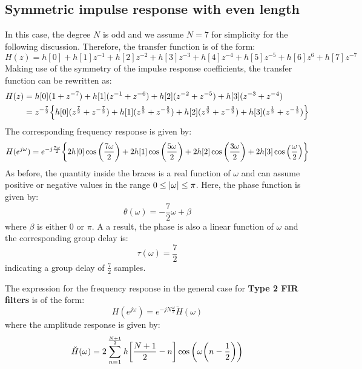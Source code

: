 \documentclass[../../main/main.tex]{subfiles}
\begin{document}
\subsection{Symmetric impulse response with even length}
In this case, the degree \( N \) is odd and we assume \( N = 7 \) for simplicity for the following discussion. Therefore, the transfer function is of the form:
\begin{equation}
    H(z)
    =
    h[0] + h[1]z^{-1} + h[2]z^{-2} + h[3]z^{-3} + h[4]z^{-4} + h[5]z^{-5} + h[6]z^{6} + h[7]z^{-7}
    \label{eq:L20_S23_1}
\end{equation}
Making use of the symmetry of the impulse response coefficients, the transfer function can be rewritten as:
\begin{align}
    H(z)
    &=
        h[0](1 + z^{-7}) + h[1](z^{-1} + z^{-6}) + h[2](z^{-2} + z^{-5}) + h[3](z^{-3} + z^{-4})   \nonumber   \\
    &=
        z^{-\frac{7}{2}} \qty{h[0](z^{\frac{7}{2}} + z^{-\frac{7}{2}}) + h[1](z^{\frac{5}{2}} + z^{-\frac{5}{2}}) + h[2](z^{\frac{3}{2}} + z^{-\frac{3}{2}}) + h[3](z^{\frac{1}{2}} + z^{-\frac{1}{2}})}
\end{align}
The corresponding frequency response is given by:%
%
\begin{equation}
    H(e^{j\omega})
    =
    e^{-j\frac{7\omega}{2}} \qty{2h[0]\cos\qty(\frac{7\omega}{2}) + 2h[1]\cos\qty(\frac{5\omega}{2}) + 2h[2]\cos\qty(\frac{3\omega}{2}) + 2h[3]\cos\qty(\frac{\omega}{2})}
    \label{eq:L20_S25_1}
\end{equation}
As before, the quantity inside the braces is a real function of \( \omega \) and can assume positive or negative values in the range \( 0 \le \abs{\omega} \le \pi \). Here, the phase function is given by:%
\begin{equation}
    \theta(\omega)
    =
    - \frac{7}{2} \omega + \beta
    \label{eq:L20_S26_1}
\end{equation}
where \( \beta \) is either \( 0 \) or \( \pi \). A a result, the phase is also a linear function of \( \omega \) and the corresponding group delay is:%
\begin{equation}
    \tau(\omega)
    =
    \frac{7}{2}
    \label{eq:L20_S26_2}
\end{equation}
indicating a group delay of \( \frac{7}{2} \) samples.

The expression for the frequency response in the general case for \textbf{Type 2 FIR filters} is of the form:%
\begin{equation}
    H(e^{j\omega})
    =
    e^{-jN \frac{\omega}{2}} \breve{H}(\omega)
    \label{eq:L20_S27_1}
\end{equation}
where the amplitude response is given by:
\begin{equation}
    \breve{H}(\omega)
    =
    2 \sum_{n=1}^{\frac{N+1}{2}} h\qty[\frac{N+1}{2} - n] \cos\qty(\omega \qty(n - \frac{1}{2}))
    \label{eq:L20_S27_2}
\end{equation}
\end{document}
